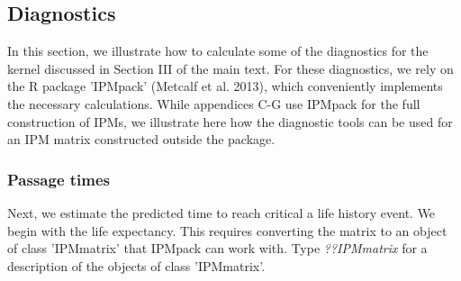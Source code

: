 \documentclass[11pt]{article}
\begin{document}
\subsection{Diagnostics}
\label{sec:Diagnostics}

In this section, we illustrate how to calculate some of the diagnostics for the kernel discussed in Section III of the main text. For these diagnostics, we rely on the R package 'IPMpack' (Metcalf et al. 2013), which conveniently implements the necessary calculations. While appendices C-G use IPMpack for the full construction of IPMs, we illustrate here how the diagnostic tools can be used for an IPM matrix constructed outside the package. 


\subsubsection{Passage times}
\label{sec:Passage times}

Next, we estimate the predicted time to reach critical a life history event. We begin with the life expectancy. This requires converting the matrix to an object of class 'IPMmatrix' that IPMpack can work with. Type \emph{??IPMmatrix} for a description of the objects of class 'IPMmatrix'. 
\end{document}
